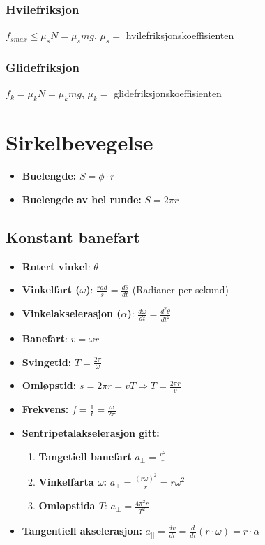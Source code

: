 \documentclass[12pt]{article}
\begin{document}
\subsubsection{Hvilefriksjon}
$f_{s max} \leq \mu_sN = \mu_smg$, $\mu_s =$ hvilefriksjonskoeffisienten
\subsubsection{Glidefriksjon}
$f_k = \mu_kN = \mu_kmg$, $\mu_k =$ glidefriksjonskoeffisienten
%
%
\section{Sirkelbevegelse}
\begin{itemize}
    \item[] \textbf{Buelengde: } $S = \phi \cdot r$
    \item[] \textbf{Buelengde av hel runde:} $S = 2\pi r$
    \
\end{itemize}

\subsection{Konstant banefart}
\begin{itemize}
    \item[] \textbf{Rotert vinkel}: $\theta$
    \item[] \textbf{Vinkelfart ($\omega$)}: $\frac{rad}{s} = \frac{d\theta}{dt}$ (Radianer per sekund)
    \item[] \textbf{Vinkelakselerasjon ($\alpha$)}: $\frac{d\omega}{dt} = \frac{d^2\theta}{dt^2}$
    \item[] \textbf{Banefart}: $v = \omega r$
    \item[] \textbf{Svingetid:} $T = \frac{2\pi}{\omega}$
    \item[] \textbf{Omløpstid:} $s = 2\pi r = vT \Rightarrow T = \frac{2\pi r}{v}$
    \item[] \textbf{Frekvens:} $f = \frac{1}{t} = \frac{\omega}{2\pi} $
    \item[] \textbf{Sentripetalakselerasjon gitt:}
    \begin{enumerate}
        \item \textbf{Tangetiell banefart} $a_\bot = \frac{v^2}{r}$
        \item \textbf{Vinkelfarta $\omega$:} $a_\bot = \frac{(r\omega)^2}{r} = r\omega^2 $
        \item \textbf{Omløpstida $T$}: $a_\bot = \frac{4\pi^2r}{T^2}$
    \end{enumerate}
    \item[] \textbf{Tangentiell akselerasjon:} $a_{||} = \frac{dv}{dt} = \frac{d}{dt}(r\cdot \omega) = r\cdot \alpha$
\end{itemize}
\pagebreak
\end{document}
